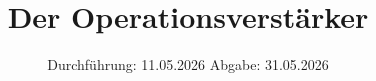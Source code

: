 


\subject{v51}
\title{Der Operationsverstärker}
\date{%
  Durchführung: 11.05.2026
  \hspace{3em}
  Abgabe: 31.05.2026
}



\maketitle
\thispagestyle{empty}
\tableofcontents
\newpage








\printbibliography{}

\newpage



